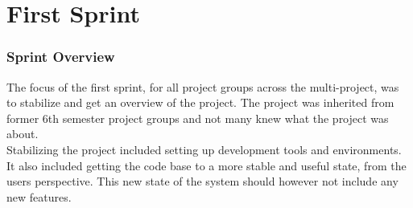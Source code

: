 \part{First Sprint}
\label{par:first_sprint}

\section{Sprint Overview}
The focus of the first sprint, for all project groups across the multi-project, was to stabilize and get an overview of the project. The project was inherited from former 6th semester project groups and not many knew what the \giraf project was about.
\\
Stabilizing the project included setting up development tools and environments. It also included getting the code base to a more stable and useful state, from the users perspective. This new state of the system should however not include any new features.








